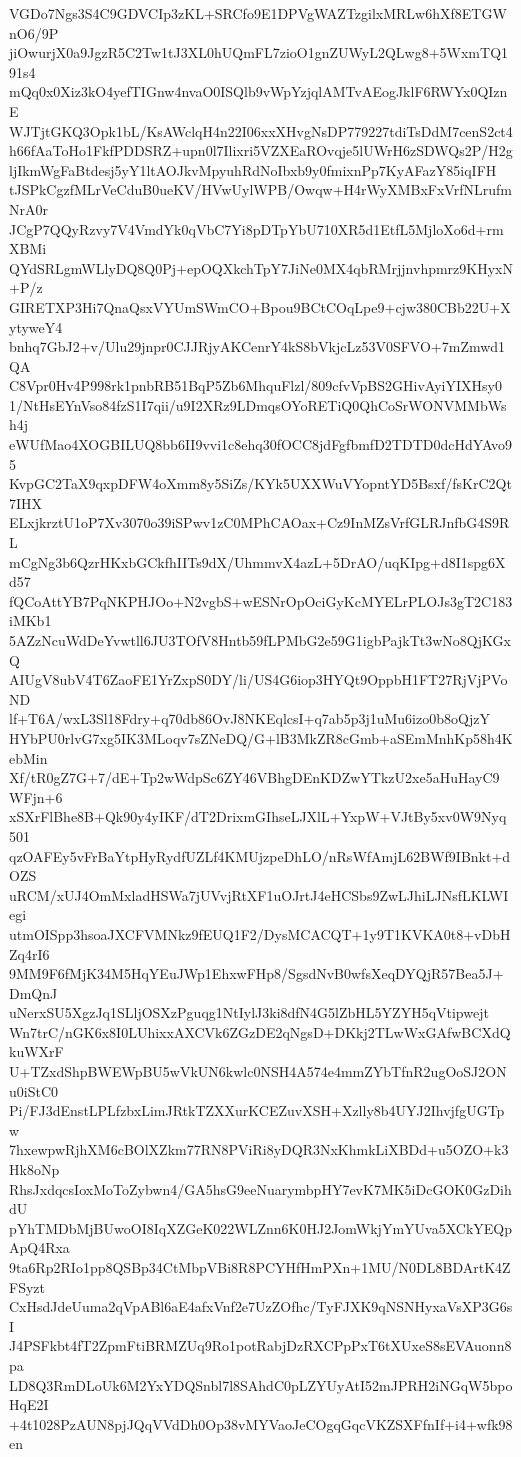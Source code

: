 VGDo7Ngs3S4C9GDVCIp3zKL+SRCfo9E1DPVgWAZTzgilxMRLw6hXf8ETGWnO6/9P
jiOwurjX0a9JgzR5C2Tw1tJ3XL0hUQmFL7zioO1gnZUWyL2QLwg8+5WxmTQ191s4
mQq0x0Xiz3kO4yefTIGnw4nvaO0ISQlb9vWpYzjqlAMTvAEogJklF6RWYx0QIznE
WJTjtGKQ3Opk1bL/KsAWclqH4n22I06xxXHvgNsDP779227tdiTsDdM7cenS2ct4
h66fAaToHo1FkfPDDSRZ+upn0l7Ilixri5VZXEaROvqje5lUWrH6zSDWQs2P/H2g
ljIkmWgFaBtdesj5yY1ltAOJkvMpyuhRdNoIbxb9y0fmixnPp7KyAFazY85iqIFH
tJSPkCgzfMLrVeCduB0ueKV/HVwUylWPB/Owqw+H4rWyXMBxFxVrfNLrufmNrA0r
JCgP7QQyRzvy7V4VmdYk0qVbC7Yi8pDTpYbU710XR5d1EtfL5MjloXo6d+rmXBMi
QYdSRLgmWLlyDQ8Q0Pj+epOQXkchTpY7JiNe0MX4qbRMrjjnvhpmrz9KHyxN+P/z
GIRETXP3Hi7QnaQsxVYUmSWmCO+Bpou9BCtCOqLpe9+cjw380CBb22U+XytyweY4
bnhq7GbJ2+v/Ulu29jnpr0CJJRjyAKCenrY4kS8bVkjcLz53V0SFVO+7mZmwd1QA
C8Vpr0Hv4P998rk1pnbRB51BqP5Zb6MhquFlzl/809cfvVpBS2GHivAyiYIXHsy0
1/NtHsEYnVso84fzS1I7qii/u9I2XRz9LDmqsOYoRETiQ0QhCoSrWONVMMbWsh4j
eWUfMao4XOGBILUQ8bb6II9vvi1c8ehq30fOCC8jdFgfbmfD2TDTD0dcHdYAvo95
KvpGC2TaX9qxpDFW4oXmm8y5SiZs/KYk5UXXWuVYopntYD5Bsxf/fsKrC2Qt7IHX
ELxjkrztU1oP7Xv3070o39iSPwv1zC0MPhCAOax+Cz9InMZsVrfGLRJnfbG4S9RL
mCgNg3b6QzrHKxbGCkfhIITs9dX/UhmmvX4azL+5DrAO/uqKIpg+d8I1spg6Xd57
fQCoAttYB7PqNKPHJOo+N2vgbS+wESNrOpOciGyKcMYELrPLOJs3gT2C183iMKb1
5AZzNcuWdDeYvwtll6JU3TOfV8Hntb59fLPMbG2e59G1igbPajkTt3wNo8QjKGxQ
AIUgV8ubV4T6ZaoFE1YrZxpS0DY/li/US4G6iop3HYQt9OppbH1FT27RjVjPVoND
lf+T6A/wxL3Sl18Fdry+q70db86OvJ8NKEqlcsI+q7ab5p3j1uMu6izo0b8oQjzY
HYbPU0rlvG7xg5IK3MLoqv7sZNeDQ/G+lB3MkZR8cGmb+aSEmMnhKp58h4KebMin
Xf/tR0gZ7G+7/dE+Tp2wWdpSc6ZY46VBhgDEnKDZwYTkzU2xe5aHuHayC9WFjn+6
xSXrFlBhe8B+Qk90y4yIKF/dT2DrixmGIhseLJXlL+YxpW+VJtBy5xv0W9Nyq501
qzOAFEy5vFrBaYtpHyRydfUZLf4KMUjzpeDhLO/nRsWfAmjL62BWf9IBnkt+dOZS
uRCM/xUJ4OmMxladHSWa7jUVvjRtXF1uOJrtJ4eHCSbs9ZwLJhiLJNsfLKLWIegi
utmOISpp3hsoaJXCFVMNkz9fEUQ1F2/DysMCACQT+1y9T1KVKA0t8+vDbHZq4rI6
9MM9F6fMjK34M5HqYEuJWp1EhxwFHp8/SgsdNvB0wfsXeqDYQjR57Bea5J+DmQnJ
uNerxSU5XgzJq1SLljOSXzPguqg1NtIylJ3ki8dfN4G5lZbHL5YZYH5qVtipwejt
Wn7trC/nGK6x8I0LUhixxAXCVk6ZGzDE2qNgsD+DKkj2TLwWxGAfwBCXdQkuWXrF
U+TZxdShpBWEWpBU5wVkUN6kwlc0NSH4A574e4mmZYbTfnR2ugOoSJ2ONu0iStC0
Pi/FJ3dEnstLPLfzbxLimJRtkTZXXurKCEZuvXSH+Xzlly8b4UYJ2IhvjfgUGTpw
7hxewpwRjhXM6cBOlXZkm77RN8PViRi8yDQR3NxKhmkLiXBDd+u5OZO+k3Hk8oNp
RhsJxdqcsIoxMoToZybwn4/GA5hsG9eeNuarymbpHY7evK7MK5iDcGOK0GzDihdU
pYhTMDbMjBUwoOI8IqXZGeK022WLZnn6K0HJ2JomWkjYmYUva5XCkYEQpApQ4Rxa
9ta6Rp2RIo1pp8QSBp34CtMbpVBi8R8PCYHfHmPXn+1MU/N0DL8BDArtK4ZFSyzt
CxHsdJdeUuma2qVpABl6aE4afxVnf2e7UzZOfhc/TyFJXK9qNSNHyxaVsXP3G6sI
J4PSFkbt4fT2ZpmFtiBRMZUq9Ro1potRabjDzRXCPpPxT6tXUxeS8sEVAuonn8pa
LD8Q3RmDLoUk6M2YxYDQSnbl7l8SAhdC0pLZYUyAtI52mJPRH2iNGqW5bpoHqE2I
+4t1028PzAUN8pjJQqVVdDh0Op38vMYVaoJeCOgqGqcVKZSXFfnIf+i4+wfk98en
